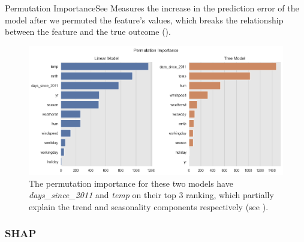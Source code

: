 \documentclass[10pt]{beamer}
\begin{document}
\begin{frame}{Permutation Importance}{See \cite[Section 5.1]{molnar2019}}
Measures the increase in the prediction error of the model after we permuted the feature's values, which breaks the relationship between the feature and the true outcome (\cite[Section 8.5]{molnar2019}).
\begin{center}
  \begin{figure}
    \includegraphics[scale=0.35]{images/interpretable_ml_104_0.png}
    \caption{The permutation importance for these two models have {\em days\_since\_2011} and {\em temp} on their top 3 ranking, which partially explain the trend and seasonality components respectively (see \cite[Figure 8.27]{molnar2019}).}
  \end{figure}
\end{center}
\end{frame}

\subsubsection{SHAP}
\end{document}

